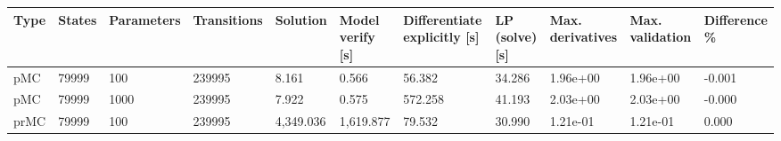 \begin{tabular}{lllllllllll}
\toprule
Type & States & Parameters & Transitions &  Solution & Model verify [s] & Differentiate explicitly [s] & LP (solve) [s] & Max. derivatives & Max. validation & Difference \% \\
\midrule
 pMC &  79999 &        100 &      239995 &     8.161 &            0.566 &                       56.382 &         34.286 &         1.96e+00 &        1.96e+00 &       -0.001 \\
 pMC &  79999 &       1000 &      239995 &     7.922 &            0.575 &                      572.258 &         41.193 &         2.03e+00 &        2.03e+00 &       -0.000 \\
prMC &  79999 &        100 &      239995 & 4,349.036 &        1,619.877 &                       79.532 &         30.990 &         1.21e-01 &        1.21e-01 &        0.000 \\
\bottomrule
\end{tabular}
